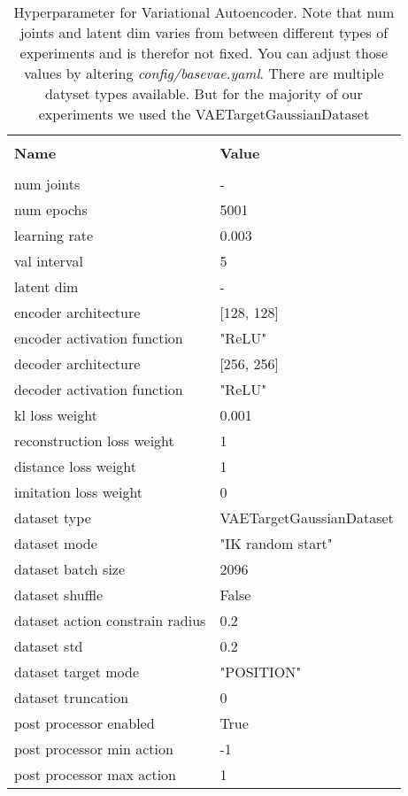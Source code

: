 \begin{table}
    \label{tab:VAE_Hyperparameters}
    \begin{center}
        \begin{tabular}{ l | l }
        \hline \\
        \textbf{Name} & \textbf{Value} \\
        \hline \\
        num joints & - \\
        num epochs & 5001 \\
        learning rate & 0.003 \\
        val interval & 5 \\
        latent dim & - \\
        encoder architecture & [128, 128] \\
        encoder activation function & "ReLU" \\
        decoder architecture & [256, 256] \\
        decoder activation function & "ReLU" \\
        kl loss weight & 0.001 \\
        reconstruction loss weight & 1 \\
        distance loss weight & 1 \\
        imitation loss weight & 0 \\
        dataset type & VAETargetGaussianDataset \\
        dataset mode & "IK random start" \\
        dataset batch size & 2096 \\
        dataset shuffle & False \\
        dataset action constrain radius & 0.2 \\
        dataset std & 0.2 \\
        dataset target mode & "POSITION" \\
        dataset truncation & 0  \\
        post processor enabled & True \\
        post processor min action & -1 \\
        post processor max action & 1 
        \end{tabular}
    \end{center}
    \caption[VAE Hyperparameter]{Hyperparameter for Variational Autoencoder. Note that num joints and latent dim varies from between different types of experiments and is therefor not fixed. You can adjust those values by altering \textit{config/base\textunderscore vae.yaml}. There are multiple datyset types available. But for the majority of our experiments we used the VAETargetGaussianDataset}
\end{table}

